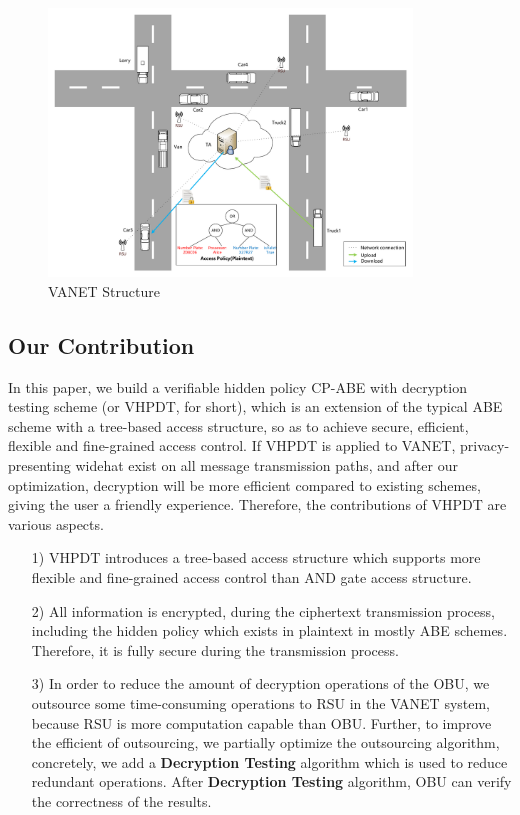 \documentclass[smallextended]{svjour3}       %
\begin{document}
	\begin{figure}\label{VANET}
		\centering
		\includegraphics[width=3.8in, keepaspectratio]{VANET.pdf}
		\caption{VANET Structure}
	\end{figure}


\subsection{Our Contribution}
	In this paper, we build a verifiable hidden policy CP-ABE with decryption testing scheme (or VHPDT, for short), which is an extension of the typical ABE scheme with a tree-based access structure, so as to achieve secure, efficient, flexible and fine-grained access control.
	If VHPDT is applied to VANET, privacy-presenting widehat exist on all message transmission paths, and after our optimization, decryption will be more efficient compared to existing schemes, giving the user a friendly experience.
	Therefore, the contributions of VHPDT are various aspects.
	\begin{itemize}
		\item [1)] VHPDT introduces a tree-based access structure which supports more flexible and fine-grained access control than AND gate access structure.
		\item [2)] All information is encrypted, during the ciphertext transmission process, including the hidden policy which exists in plaintext in mostly ABE schemes.
					Therefore, it is fully secure during the transmission process.
		\item [3)] In order to reduce the amount of decryption operations of the OBU, we outsource some time-consuming operations to RSU in the VANET system, because RSU is more computation capable than OBU.
					Further, to improve the efficient of outsourcing, we partially optimize the outsourcing algorithm, concretely, we add a \textbf{Decryption Testing} algorithm which is used to reduce redundant operations.
					After \textbf{Decryption Testing} algorithm, OBU can verify the correctness of the results.
	\end{itemize}
\end{document}
